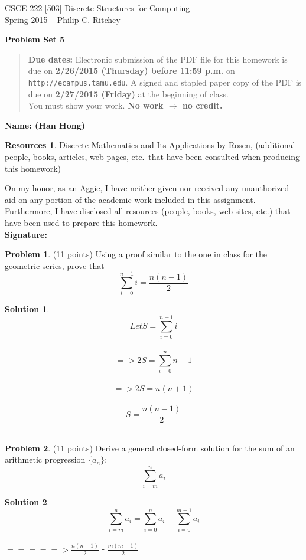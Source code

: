 \documentclass{article}
\theoremstyle{definition}
\newtheorem{problem}{Problem}
\newtheorem*{solution}{Solution}
\newtheorem*{resources}{Resources}
\newcommand{\name}[1]{\noindent\textbf{Name: #1}}
\newcommand{\honor}{\noindent On my honor, as an Aggie, I have neither given nor received any unauthorized aid on any portion of the academic work included in this assignment. Furthermore, I have disclosed all resources (people, books, web sites, etc.) that have been used to prepare this homework. 
\\[2ex]
\textbf{Signature:} \underline{\hspace*{7cm}} }
\newcommand{\problemset}[1]{\begin{center}\textbf{Problem Set #1}\end{center}}
\newcommand{\duedate}[2]{\begin{quote}\textbf{Due dates:} Electronic
    submission of the PDF file for this homework is due on
    \textbf{#1} on \texttt{http://ecampus.tamu.edu}.  A signed and stapled paper copy of the PDF is due on
    \textbf{#2} at the beginning of class.\\You must show your work.  \textbf{No work $\to$ no credit.}\end{quote} }
\begin{document}
\begin{center}
{\large
CSCE 222 [503] Discrete Structures for Computing\\[.5ex]
Spring 2015 -- Philip C. Ritchey\\}
\end{center}

\problemset{5}

\duedate{2/26/2015 (Thursday) before 11:59 p.m.}{2/27/2015 (Friday)}

\name{ (Han Hong) }

\begin{resources} Discrete Mathematics and Its Applications by Rosen, (additional people, books, articles, web pages, etc.\ that
  have been consulted when producing this homework)
\end{resources}

\honor

\bigskip

\begin{problem} (11 points)
Using a proof similar to the one in class for the geometric series, prove that
$$\displaystyle \sum_{i=0}^{n-1} i = \frac{n(n-1)}{2}$$
\end{problem}
\begin{solution}~\\
$$\displaystyle Let S = \sum_{i=0}^{n-1} i$$ \\
$$\displaystyle => 2S = \sum_{i=0}^{n} n+1$$ \\
$$\displaystyle => 2S = n(n+1)$$ \\
$$\displaystyle S = \frac{n(n-1)}{2}$$ \\
\end{solution}

\begin{problem} (11 points)
Derive a general closed-form solution for the sum of an arithmetic progression $\{a_n\}$:
$$\displaystyle \sum_{i=m}^{n} a_i$$
\end{problem}
\begin{solution}~\\
$$\displaystyle \sum_{i=m}^{n} a_i = \sum_{i=0}^{n} a_i - \sum_{i=0}^{m-1} a_i$$ \\
\indent $ =====> \frac{n(n+1)}{2}$ - $\frac{m(m-1)}{2}$
\end{solution}
\end{document}
